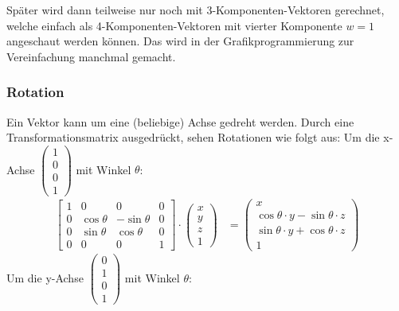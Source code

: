 \documentclass[titlepage, 11pt, a4paper, ngerman]{article}
\begin{document}
\bigbreak
Später wird dann teilweise nur noch mit 3-Komponenten-Vektoren gerechnet, welche einfach als 4-Komponenten-Vektoren mit vierter Komponente $w = 1$ angeschaut werden können. Das wird in der Grafikprogrammierung zur Vereinfachung manchmal gemacht.

\subsubsection{Rotation}
Ein Vektor kann um eine (beliebige) Achse gedreht werden. Durch eine Transformationsmatrix ausgedrückt, sehen Rotationen wie folgt aus: \bigbreak
Um die x-Achse $
\begin{pmatrix}
1 \\
0 \\
0 \\
1
\end{pmatrix}$ mit Winkel $\theta$:
\begin{align*}
    \begin{bmatrix} 
    1 & 0 & 0 & 0 \\
    0 & \cos{\theta} & - \sin{\theta} & 0 \\
    0 & \sin{\theta} & \cos{\theta} & 0 \\
    0 & 0 & 0 & 1
    \end{bmatrix} \cdot
    \begin{pmatrix}
    x \\ y \\ z \\ 1
    \end{pmatrix} &= 
    \begin{pmatrix}
    x \\
    \cos{\theta} \cdot y - \sin{\theta} \cdot z \\
    \sin{\theta} \cdot y + \cos{\theta} \cdot z \\
    1
    \end{pmatrix}
\end{align*}
\bigbreak
Um die y-Achse $
\begin{pmatrix}
0 \\
1 \\
0 \\
1
\end{pmatrix}$ mit Winkel $\theta$:
\end{document}

